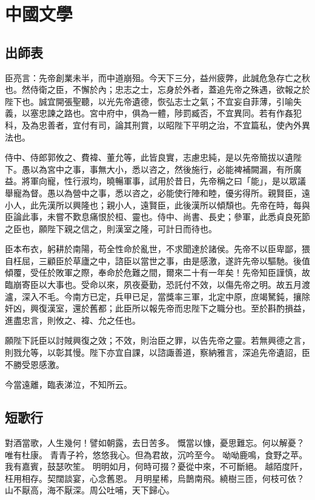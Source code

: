
\chapter{中國文學}

\section{出師表}

臣亮言：先帝創業未半，而中道崩殂。今天下三分，益州疲弊，此誠危急存亡之秋也。然侍衛之臣，不懈於內；忠志之士，忘身於外者，蓋追先帝之殊遇，欲報之於陛下也。誠宜開張聖聽，以光先帝遺德，恢弘志士之氣；不宜妄自菲薄，引喻失義，以塞忠諫之路也。宮中府中，俱為一體，陟罰臧否，不宜異同。若有作姦犯科，及為忠善者，宜付有司，論其刑賞，以昭陛下平明之治，不宜篇私，使內外異法也。\par

侍中、侍郎郭攸之、費褘、董允等，此皆良實，志慮忠純，是以先帝簡拔以遺陛下。愚以為宮中之事，事無大小，悉以咨之，然後施行，必能裨補闕漏，有所廣益。將軍向寵，性行淑均，曉暢軍事，試用於昔日，先帝稱之曰「能」，是以眾議舉寵為督。愚以為營中之事，悉以咨之，必能使行陣和睦，優劣得所。親賢臣，遠小人，此先漢所以興隆也；親小人，遠賢臣，此後漢所以傾頹也。先帝在時，每與臣論此事，未嘗不歎息痛恨於桓、靈也。侍中、尚書、長史；參軍，此悉貞良死節之臣也，願陛下親之信之，則漢室之隆，可計日而待也。

臣本布衣，躬耕於南陽，苟全性命於亂世，不求聞達於諸侯。先帝不以臣卑鄙，猥自枉屈，三顧臣於草廬之中，諮臣以當世之事，由是感激，遂許先帝以驅馳。後值傾覆，受任於敗軍之際，奉命於危難之間，爾來二十有一年矣！先帝知臣謹慎，故臨崩寄臣以大事也。受命以來，夙夜憂勤，恐託付不效，以傷先帝之明。故五月渡瀘，深入不毛。今南方已定，兵甲已足，當獎率三軍，北定中原，庶竭駑鈍，攘除奸凶，興復漢室，還於舊都；此臣所以報先帝而忠陛下之職分也。至於斟酌損益，進盡忠言，則攸之、褘、允之任也。

願陛下託臣以討賊興復之效；不效，則治臣之罪，以告先帝之靈。若無興德之言，則戮允等，以彰其慢。陛下亦宜自課，以諮諏善道，察納雅言，深追先帝遺詔，臣不勝受恩感激。

今當遠離，臨表涕泣，不知所云。

\section{短歌行}

對酒當歌，人生幾何！譬如朝露，去日苦多。
慨當以慷，憂思難忘。何以解憂？唯有杜康。
青青子衿，悠悠我心。但為君故，沉吟至今。
呦呦鹿鳴，食野之苹。我有嘉賓，鼓瑟吹笙。
明明如月，何時可掇？憂從中來，不可斷絕。
越陌度阡，枉用相存。契闊談宴，心念舊恩。
月明星稀，烏鵲南飛。繞樹三匝，何枝可依？
山不厭高，海不厭深。周公吐哺，天下歸心。